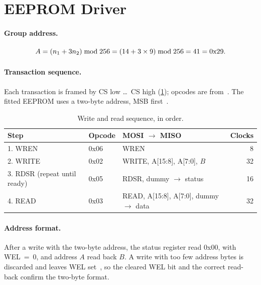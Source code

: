 \section{EEPROM Driver}
\label{sec:eeprom}

\paragraph{Group address.}
\begin{equation}
  A = (n_1 + 3n_2) \bmod 256 = (14 + 3 \times 9) \bmod 256
    = 41 = \text{0x29}.
\end{equation}

\paragraph{Transaction sequence.}
Each transaction is framed by CS low \ldots\ CS high (\cref{tab:transactions});
opcodes are from~\cite[Tab.~9]{eeprom}. The fitted EEPROM uses a two-byte
address, MSB first~\cite{readme}.

\begin{table}[htbp]
  \centering
  \caption{Write and read sequence, in order.}
  \label{tab:transactions}
  \small
  \begin{tabularx}{\linewidth}{@{}l l X r@{}}
    \toprule
    \textbf{Step} & \textbf{Opcode} & \textbf{MOSI $\rightarrow$ MISO} & \textbf{Clocks} \\
    \midrule
    1. WREN  & 0x06 & WREN & 8 \\
    2. WRITE & 0x02 & WRITE, A[15:8], A[7:0], $B$ & 32 \\
    3. RDSR (repeat until ready) & 0x05 & RDSR, dummy $\rightarrow$ status & 16 \\
    4. READ  & 0x03 & READ, A[15:8], A[7:0], dummy $\rightarrow$ data & 32 \\
    \bottomrule
  \end{tabularx}
\end{table}

\paragraph{Address format.}
After a write with the two-byte address, the status register read
0x00, with WEL~=~0, and address $A$ read back $B$. A write with too
few address bytes is discarded and leaves WEL set~\cite{readme}, so the cleared
WEL bit and the correct read-back confirm the two-byte format.

